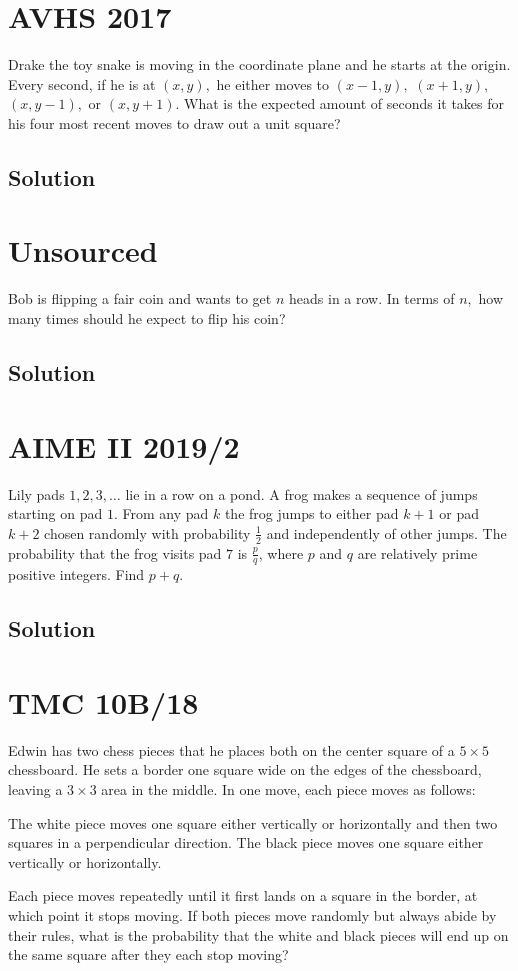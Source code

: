 \documentclass[blue,onecol]{shooting}
\begin{document}
\section{AVHS 2017} Drake the toy snake is moving in the coordinate plane and he starts at the origin. Every second, if he is at $(x,y),$ he either moves to $(x-1,y),$ $(x+1,y),$ $(x,y-1),$ or $(x,y+1).$ What is the expected amount of seconds it takes for his four most recent moves to draw out a unit square?
\subsection{Solution}




\section{Unsourced}
Bob is flipping a fair coin and wants to get $n$ heads in a row. In terms of $n,$ how many times should he expect to flip his coin?
\subsection{Solution}





\section{AIME II 2019/2} Lily pads $1,2,3,\ldots$ lie in a row on a pond. A frog makes a sequence of jumps starting on pad $1$. From any pad $k$ the frog jumps to either pad $k+1$ or pad $k+2$ chosen randomly with probability $\tfrac{1}{2}$ and independently of other jumps. The probability that the frog visits pad $7$ is $\tfrac{p}{q}$, where $p$ and $q$ are relatively prime positive integers. Find $p+q$.
\subsection{Solution}




\section{TMC 10B/18} Edwin has two chess pieces that he places both on the center square of a $5\times 5$ chessboard. He sets a border one square wide on the edges of the chessboard, leaving a $3\times 3$ area in the middle. In one move, each piece moves as follows:
    \begin{itemize}
\Item The white piece moves one square either vertically or horizontally and then two squares in a perpendicular direction.
\Item The black piece moves one square either vertically or horizontally.
\end{itemize}
Each piece moves repeatedly until it first lands on a square in the border, at which point it stops moving. If both pieces move randomly but always abide by their rules, what is the probability that the white and black pieces will end up on the same square after they each stop moving?
\end{document}
